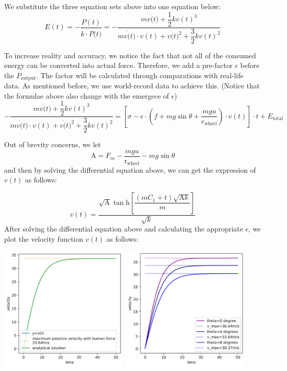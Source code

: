 \documentclass{article}
\begin{document}
\begin{itemize}
					We substitute the three equation sets above into one equation below:
					\[E (t)=-\dfrac{P (t)}{ k \cdot P \dot(t)}=-\dfrac{mv\ddot(t)+\dfrac{1}{2} k {v(t)}^3}{mv\dot(t)\cdot v(t)+v\dot(t)^2+\dfrac{3}{2} k {v(t)}^2}\]

					To increase reality and accuracy, we notice the fact that not all of the consumed energy can be converted into actual force. Therefore, we add a pre-factor \(\epsilon\) before the \(P_{\mathrm{output}}\). The factor will be calculated through comparations with real-life data. As mentioned before, we use world-record data to achieve this. (Notice that the formulae above also change with the emergece of \(\epsilon\))
					\[ -\dfrac{mv\ddot(t)+\dfrac{1}{2} k {v(t)}^3}{mv\dot(t)\cdot v(t)+v\dot(t)^2+\dfrac{3}{2} k {v(t)}^2} =  \left[\sigma-\epsilon\cdot\left(f+mg\sin \theta + \dfrac{mgu}{r_{\mathrm{wheel}}} \right)\cdot v(t)\right]\cdot t+ E _\mathrm{total}\]

					Out of brevity concerns, we let
					\[ \mathrm{A}=F_m-\dfrac{mgu}{\mathrm{r}_\mathrm{wheel}}-mg\sin \theta \]
					and then by solving the differential equation above, we can get the expression of \(v(t)\) as follows:

					\[v(t)=\dfrac{\sqrt{\mathrm{A}} \tan \mathrm{h}\left[\dfrac{\left(m C _1+t\right)\sqrt{\mathrm{A}k}}{m}\right]}{\sqrt{ k }}\]
					After solving the differential equation above and calculating the appropriate \(\epsilon\), we plot the velocity function \(v\left(t\right)\) as follows:

					\begin{center}
						\includegraphics[height=6cm]{1.png}
						\includegraphics[height=6cm]{2.png}


\end{center}
\end{itemize}
\end{document}

